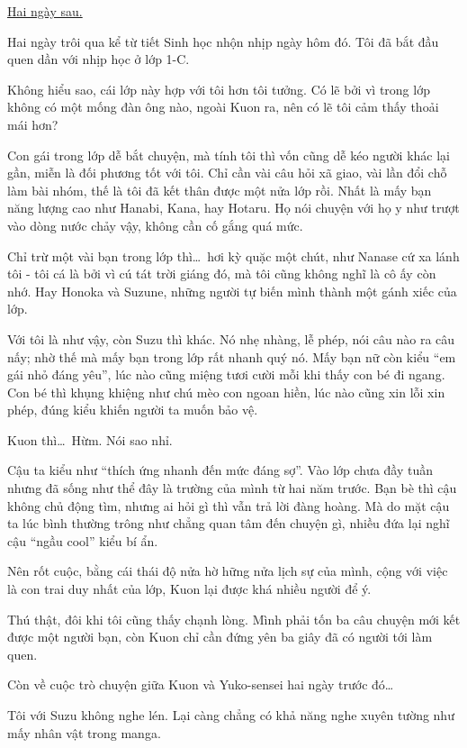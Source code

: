 \documentclass[../main.tex]{subfiles}
\begin{document}
\begin{center}
  \uline{Hai ngày sau.}
\end{center}

Hai ngày trôi qua kể từ tiết Sinh học nhộn nhịp ngày hôm đó. Tôi đã bắt đầu quen dần với nhịp học ở lớp 1-C.

Không hiểu sao, cái lớp này hợp với tôi hơn tôi tưởng. Có lẽ bởi vì trong lớp không có một mống đàn ông nào, ngoài Kuon ra, nên có lẽ tôi cảm thấy thoải mái hơn?

Con gái trong lớp dễ bắt chuyện, mà tính tôi thì vốn cũng dễ kéo người khác lại gần, miễn là đối phương tốt với tôi. Chỉ cần vài câu hỏi xã giao, vài lần đổi chỗ làm bài nhóm, thế là tôi đã kết thân được một nửa lớp rồi. Nhất là mấy bạn năng lượng cao như Hanabi, Kana, hay Hotaru. Họ nói chuyện với họ y như trượt vào dòng nước chảy vậy, không cần cố gắng quá mức.

Chỉ trừ một vài bạn trong lớp thì\dots\ hơi kỳ quặc một chút, như Nanase cứ xa lánh tôi - tôi cá là bởi vì cú tát trời giáng đó, mà tôi cũng không nghĩ là cô ấy còn nhớ. Hay Honoka và Suzune, những người tự biến mình thành một gánh xiếc của lớp.

Với tôi là như vậy, còn Suzu thì khác. Nó nhẹ nhàng, lễ phép, nói câu nào ra câu nấy; nhờ thế mà mấy bạn trong lớp rất nhanh quý nó. Mấy bạn nữ còn kiểu ``em gái nhỏ đáng yêu'', lúc nào cũng miệng tươi cười mỗi khi thấy con bé đi ngang. Con bé thì khụng khiệng như chú mèo con ngoan hiền, lúc nào cũng xin lỗi xin phép, đúng kiểu khiến người ta muốn bảo vệ.

Kuon thì\dots\ Hừm. Nói sao nhỉ.

Cậu ta kiểu như ``thích ứng nhanh đến mức đáng sợ''. Vào lớp chưa đầy tuần nhưng đã sống như thể đây là trường của mình từ hai năm trước. Bạn bè thì cậu không chủ động tìm, nhưng ai hỏi gì thì vẫn trả lời đàng hoàng. Mà do mặt cậu ta lúc bình thường trông như chẳng quan tâm đến chuyện gì, nhiều đứa lại nghĩ cậu ``ngầu cool'' kiểu bí ẩn.

Nên rốt cuộc, bằng cái thái độ nửa hờ hững nửa lịch sự của mình, cộng với việc là con trai duy nhất của lớp, Kuon lại được khá nhiều người để ý.

Thú thật, đôi khi tôi cũng thấy chạnh lòng. Mình phải tốn ba câu chuyện mới kết được một người bạn, còn Kuon chỉ cần đứng yên ba giây đã có người tới làm quen.

Còn về cuộc trò chuyện giữa Kuon và Yuko-sensei hai ngày trước đó\dots

Tôi với Suzu không nghe lén. Lại càng chẳng có khả năng nghe xuyên tường như mấy nhân vật trong manga.
\end{document}
